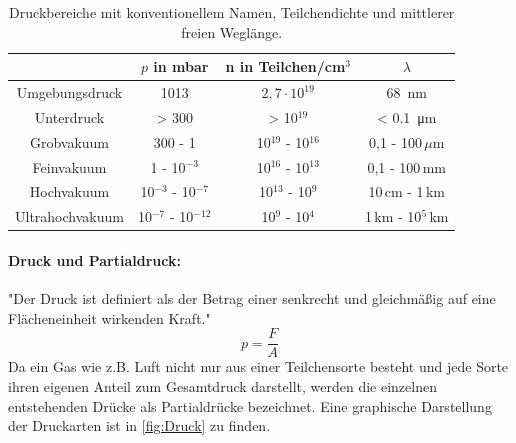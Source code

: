 \begin{table}
  \centering
  \caption{Druckbereiche mit konventionellem Namen, Teilchendichte und mittlerer freien Weglänge.}
  \label{tab:Vakuum}
  \begin{tabular}{cccc}
    \toprule
    &$p$ in mbar & n in Teilchen/cm$^3$ & $\lambda$ \\
    \midrule
    Umgebungsdruck & 1013 & $2,7\cdot10^{19}$ & \SI{68}{\nano\meter} \\
    Unterdruck & > 300 & > 10$^{19}$ & < \SI{0.1}{\micro\meter} \\
    Grobvakuum & 300 - 1 & 10$^{19}$ - 10$^{16}$ & 0,1 - 100$\,\mu$m \\
    Feinvakuum & 1 - 10$^{-3}$ & 10$^{16}$ - 10$^{13}$ & 0,1 - 100$\,$mm \\
    Hochvakuum & 10$^{-3}$ - 10$^{-7}$ & 10$^{13}$ - 10$^{9}$ & 10$\,$cm - 1$\,$km \\
    Ultrahochvakuum & 10$^{-7}$ - 10$^{-12}$ & 10$^{9}$ - 10$^{4}$ & 1$\,$km - 10$^5\,$km \\
  \end{tabular}
\end{table}

\paragraph{Druck und Partialdruck:}
"Der Druck ist definiert als der Betrag einer senkrecht und gleichmäßig auf eine Flächeneinheit wirkenden Kraft."\cite{pfeiffer}
\begin{equation}
  p = \frac{F}{A}
\end{equation}
Da ein Gas wie z.B. Luft nicht nur aus einer Teilchensorte besteht und jede Sorte ihren eigenen Anteil zum Gesamtdruck darstellt, werden
die einzelnen entstehenden Drücke als Partialdrücke bezeichnet. Eine graphische Darstellung der Druckarten ist in \ref{fig:Druck} zu finden.

